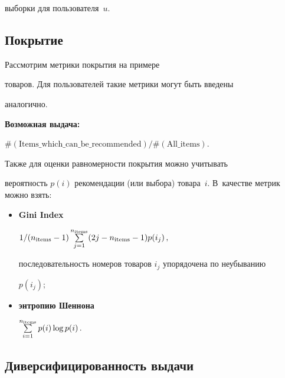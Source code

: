 выборки для пользователя~$u.$





\subsection{Покрытие} 





Рассмотрим метрики покрытия на примере


товаров. Для пользователей такие метрики могут быть введены


аналогично.








\noindent


\textbf{Возможная выдача:}


$


{\#(\mathrm{Items}\_\mathrm{which}\_\mathrm{can}\_\mathrm{be}\_\mathrm{recommended})}/{\#(\mathrm{All}\_\mathrm{items})}$.





Также для оценки равномерности покрытия можно учитывать


вероятность $p(i)$ рекомендации (или выбора) товара~$i.$ В~качестве метрик можно взять:


\begin{itemize}


    \item \textbf{Gini Index}


$


1/(\nit-1) \sum\limits_{j=1}^{\nit}(2j-\nit-1)p(i_j)\,,


$


последовательность номеров товаров $i_j$ упорядочена по неубыванию


$p(i_j);$ 





\item \textbf{энтропию Шеннона}


$


\sum \limits_{i=1}^{\nit} p(i)\log p(i)\,.


$


\end{itemize}





\subsection{Диверсифицированность выдачи} 





